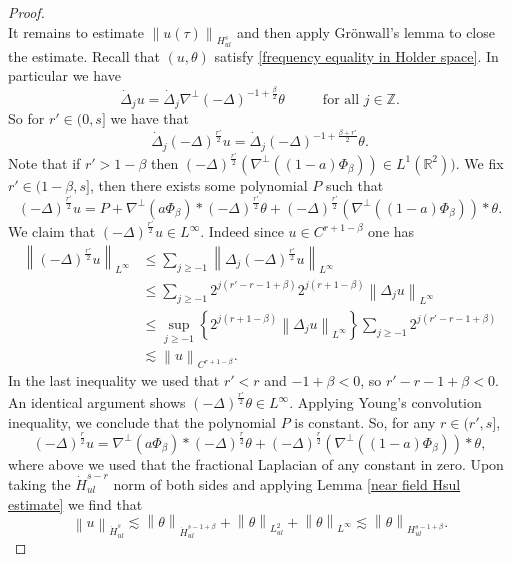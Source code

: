 \documentclass[12pt,xcolor=svgnames]{amsart}
\newcommand{\R}{\mathbb{R}}
\newcommand{\norm}[2]{\left\lVert#1\right\rVert_{#2}}
\begin{document}
\begin{proof}
\begin{equation}
\end{equation}
It remains to estimate $\norm{u(\tau)}{H_{ul}^s}$ and then apply Grönwall's lemma to close the estimate. Recall that $(u,\theta)$ satisfy \eqref{frequency equality in Holder space}. In particular we have
$$
\dot{\Delta}_j u = \dot{\Delta}_j\nabla^{\perp}(-\Delta)^{-1+\frac{\beta}{2}}\theta \hspace{1cm} \text{ for all } j \in \mathbb{Z}.
$$ 
So for $r' \in (0,s]$ we have that 
$$
\dot{\Delta}_j(-\Delta)^{\frac{r'}{2}}u = \dot{\Delta}_j (-\Delta)^{-1+\frac{\beta+r'}{2}}\theta.
$$
Note that if $r'>1-\beta$ then $(-\Delta)^{\frac{r'}{2}}(\nabla^{\perp}((1-a)\Phi_{\beta})) \in L^1(\R^2))$. We fix $r' \in (1-\beta,s]$, then there exists some polynomial $P$ such that 
\begin{equation}
\label{eq1} (-\Delta)^{\frac{r'}{2}}u = P + \nabla^{\perp}(a\Phi_{\beta})\ast (-\Delta)^{\frac{r'}{2}}\theta + (-\Delta)^{\frac{r'}{2}}(\nabla^{\perp}((1-a)\Phi_{\beta}))\ast \theta.
\end{equation}
We claim that $(-\Delta)^{\frac{r'}{2}}u \in L^{\infty}$. Indeed since $u \in C^{r+1-\beta}$ one has 
\begin{align*}
\norm{(-\Delta)^{\frac{r'}{2}}u}{L^{\infty}}&\leq \sum_{j \geq -1} \norm{\Delta_j(-\Delta)^{\frac{r'}{2}}u}{L^{\infty}}\\
&\leq \sum_{j \geq -1} 2^{j(r'-r-1+\beta)}2^{j(r+1-\beta)}\norm{\Delta_ju}{L^{\infty}}\\
&\leq \sup_{j \geq -1} \left\{ 2^{j(r+1-\beta)}\norm{\Delta_ju}{L^{\infty}}\right\} \sum_{j \geq -1} 2^{j(r'-r-1+\beta)}\\
&\lesssim \norm{u}{C^{r+1-\beta}}.
\end{align*}
In the last inequality we used that $r'<r$ and $-1+\beta<0$, so $r'-r-1+\beta<0$. An identical argument shows $(-\Delta)^{\frac{r'}{2}}\theta \in L^{\infty}$. Applying Young's convolution inequality, we conclude that the polynomial $P$ is constant. So, for any $r \in (r',s]$, 
\begin{equation}
\label{hg estimate apriori}
(-\Delta)^{\frac{r}{2}} u = \nabla^{\perp}(a\Phi_{\beta}) \ast (-\Delta)^{\frac{r}{2}}\theta + (-\Delta)^{\frac{r}{2}}(\nabla^{\perp}((1-a)\Phi_{\beta})) \ast \theta,
\end{equation}
where above we used that the fractional Laplacian of any constant in zero.
Upon taking the $\dot{H}_{ul}^{s-r}$ norm of both sides and applying Lemma \ref{near field Hsul estimate} we find that 
$$
\norm{u}{\dot{H}_{ul}^{s}} \lesssim \norm{\theta}{\dot{H}_{ul}^{s-1+\beta}}+\norm{\theta}{L^2_{ul}}+\norm{\theta}{L^{\infty}} \lesssim \norm{\theta}{H_{ul}^{s-1+\beta}}.
$$
\end{proof}
\end{document}
